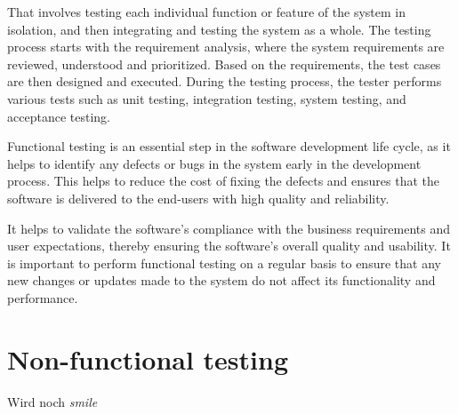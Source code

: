 That involves testing each individual function or feature of the system in isolation, and then 
integrating and testing the system as a whole. The testing process starts with the requirement analysis, 
where the system requirements are reviewed, understood and prioritized. Based on the requirements, 
the test cases are then designed and executed. During the testing process, the tester performs 
various tests such as unit testing, integration testing, system testing, and acceptance testing.

Functional testing is an essential step in the software development life cycle, as it helps to 
identify any defects or bugs in the system early in the development process. This helps to 
reduce the cost of fixing the defects and ensures that the software is delivered to the 
end-users with high quality and reliability.

It helps to validate the software's compliance with the business requirements 
and user expectations, thereby ensuring the software's overall quality and usability. 
It is important to perform functional testing on a regular basis to ensure that 
any new changes or updates made to the system do not affect its functionality and performance.


\section{Non-functional testing}
Wird noch \emph{smile}